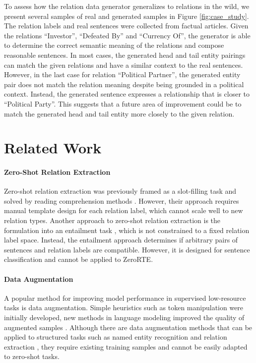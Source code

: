 \documentclass[11pt]{article}
\begin{document}
To assess how the relation data generator generalizes to relations in the wild, we present several samples of real and generated samples in Figure \ref{fig:case_study}.
The relation labels and real sentences were collected from factual articles.
Given the relations ``Investor'', ``Defeated By'' and ``Currency Of'', the generator is able to determine the correct semantic meaning of the relations and compose reasonable sentences.
In most cases, the generated head and tail entity pairings can match the given relations and have a similar context to the real sentences. 
However, in the last case for relation ``Political Partner'', the generated entity pair does not match the relation meaning despite being grounded in a political context.
Instead, the generated sentence expresses a relationship that is closer to ``Political Party''.
This suggests that a future area of improvement could be to match the generated head and tail entity more closely to the given relation.




\section{Related Work}
\paragraph{Zero-Shot Relation Extraction}
Zero-shot relation extraction was previously framed as a slot-filling task and solved by reading comprehension methods \cite{levy2017zero}.
However, their approach requires manual template design for each relation label, which cannot scale well to new relation types.
Another approach to zero-shot relation extraction is the formulation into an entailment task \cite{obamuyide2018zero}, which is not constrained to a fixed relation label space.
Instead, the entailment approach determines if arbitrary pairs of sentences and relation labels are compatible.
However, it is designed for sentence classification and cannot be applied to ZeroRTE.

\paragraph{Data Augmentation}
A popular method for improving model performance in supervised low-resource tasks is data augmentation. 
Simple heuristics such as token manipulation \cite{kobayashi2018contextual} were initially developed, new methods in language modeling improved the quality of augmented samples \cite{xie2020unsupervised, wei2019eda}.
Although there are data augmentation methods that can be applied to structured tasks such as named entity recognition \cite{ding-etal-2020-daga} and relation extraction \cite{papanikolaou2020dare, lee2021neural}, they require existing training samples and cannot be easily adapted to zero-shot tasks.
\end{document}

